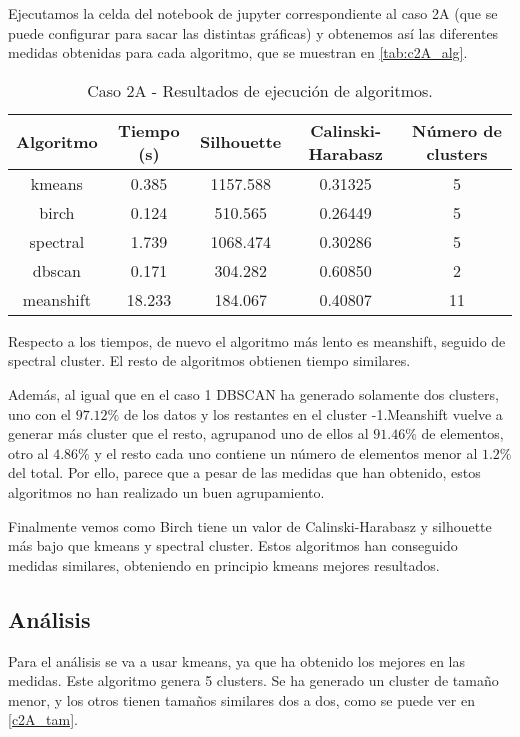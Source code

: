 Ejecutamos la celda del notebook de jupyter correspondiente al caso 2A (que se puede configurar para sacar las distintas gráficas) y obtenemos así las diferentes medidas obtenidas para cada algoritmo, que se muestran en \eqref{tab:c2A_alg}.

\begin{table}[H]
\centering
\caption{Caso 2A - Resultados de ejecución de algoritmos.}
\label{tab:c2_alg}
\begin{tabular}{ccccc}
\toprule
 Algoritmo & Tiempo (s) & Silhouette & Calinski-Harabasz & Número de clusters \\
\midrule
kmeans & 0.385 & 1157.588 & 0.31325 & 5 \\
birch & 0.124 & 510.565 & 0.26449 & 5 \\
spectral & 1.739 & 1068.474 & 0.30286 & 5 \\
dbscan & 0.171 & 304.282 & 0.60850 & 2 \\
meanshift & 18.233 & 184.067 & 0.40807 & 11 \\
\bottomrule
\end{tabular}
\end{table}

Respecto a los tiempos, de nuevo el algoritmo más lento es meanshift, seguido de spectral cluster. El resto de algoritmos obtienen tiempo similares.

Además, al igual que en el caso 1 DBSCAN ha generado solamente dos clusters, uno con el $97.12\%$ de los datos y los restantes en el cluster -1.Meanshift vuelve a generar más cluster que el resto, agrupanod uno de ellos al $91.46\%$ de elementos, otro al $4.86\%$ y el resto cada uno contiene un número de elementos menor al $1.2\%$ del total. Por ello, parece que a pesar de las medidas que han obtenido, estos algoritmos no han realizado un buen agrupamiento.

Finalmente vemos como Birch tiene un valor de Calinski-Harabasz y silhouette más bajo que kmeans y spectral cluster. Estos algoritmos han conseguido medidas similares, obteniendo en principio kmeans mejores resultados.


\subsection{Análisis}


Para el análisis se va a usar kmeans, ya que ha obtenido los mejores en las medidas. Este algoritmo genera 5 clusters. Se ha generado un cluster de tamaño menor, y los otros tienen tamaños similares dos a dos, como se puede ver en \eqref{c2A_tam}.

